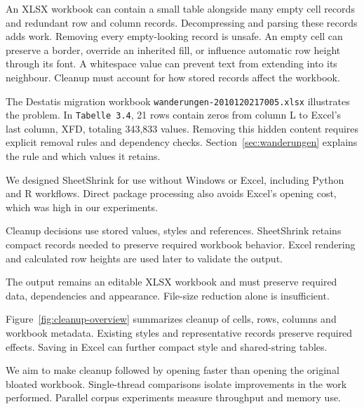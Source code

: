 An XLSX workbook can contain a small table alongside many empty cell records
and redundant row and column records. Decompressing and parsing these records
adds work. Removing every empty-looking record is
unsafe. An empty cell can preserve a border, override an inherited fill, or
influence automatic row height through its font. A whitespace value can prevent
text from extending into its neighbour. Cleanup must account for how stored records affect the workbook.

The Destatis migration workbook \texttt{wanderungen-\allowbreak 2010120217005.xlsx}
illustrates the problem. In \texttt{Tabelle 3.4}, 21 rows contain zeros from
column L to Excel's last column, XFD, totaling 343,833 values. Removing this
hidden content requires explicit removal rules and dependency checks.
Section~\ref{sec:wanderungen} explains the rule and which values it retains.

We designed SheetShrink for use without Windows or Excel, including Python
and R workflows. Direct package processing also avoids Excel's opening cost,
which was high in our experiments.

Cleanup decisions use stored values, styles and references. SheetShrink retains
compact records needed to preserve required workbook behavior. Excel rendering
and calculated row heights are used later to validate the output.

The output remains an editable XLSX workbook and must preserve required data,
dependencies and appearance. File-size reduction alone is insufficient.

Figure~\ref{fig:cleanup-overview} summarizes cleanup of cells, rows, columns and
workbook metadata. Existing styles and representative records preserve required
effects. Saving in Excel can further compact style and shared-string tables.

We aim to make cleanup followed by opening faster than opening the original
bloated workbook. Single-thread comparisons isolate improvements in the work
performed. Parallel corpus experiments measure throughput and memory use.
